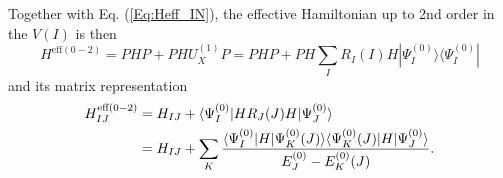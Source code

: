 Together with Eq. (\ref{Eq:Heff_IN}), the effective Hamiltonian up to 2nd order in the $V(I)$ is then
	\begin{equation}
	\label{Eq:Heff_multipart_basisindep}
	{H^{{\text{eff}}(0 - 2)}} = PHP + PHU_X^{(1)}P = PHP + PH\sum\limits_I {{R_I}} (I)H|\Psi _I^{(0)}\rangle \langle \Psi _I^{(0)}|
	\end{equation} 	
and its matrix representation
	\begin{equation}
	\label{Eq:Heff_multipart}
	\begin{split}
  H_{IJ}^{{\text{eff}}(0 - 2)} &= {H_{IJ}} + \langle \Psi _I^{(0)}|H{R_J}(J)H|\Psi _J^{(0)}\rangle  \hfill \\
   &= {H_{IJ}} + \sum\limits_K {\frac{{\langle \Psi _I^{(0)}|H|\Psi _K^{(0)}(J)\rangle \langle \Psi _K^{(0)}(J)|H|\Psi _J^{(0)}\rangle }}{{E_J^{(0)} - E_K^{(0)}(J)}}}. 
\end{split} 
\end{equation} 	

